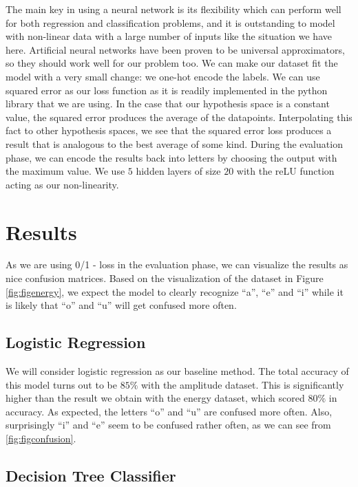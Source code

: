 \documentclass[letterpaper,12pt]{article}
\begin{document}
The main key in using a neural network is its flexibility which can perform well for both regression and classification problems, and it is outstanding to model with non-linear data with a large number of inputs like the situation we have here. Artificial neural networks have been proven to be universal approximators, so they should work well for our problem too. We can make our dataset fit the model with a very small change: we one-hot encode the labels. We can use squared error as our loss function as it is readily implemented in the python library that we are using. In the case that our hypothesis space is a constant value, the squared error produces the average of the datapoints. Interpolating this fact to other hypothesis spaces, we see that the squared error loss produces a result that is analogous to the best average of some kind. During the evaluation phase, we can encode the results back into letters by choosing the output with the maximum value. We use $5$ hidden layers of size $20$ with the reLU function acting as our non-linearity.


\section{Results}

As we are using 0/1 - loss in the evaluation phase, we can visualize the results as nice confusion matrices. Based on the visualization of the dataset in Figure \ref{fig:figenergy}, we expect the model to clearly recognize ``a'', ``e'' and ``i'' while it is likely that ``o'' and ``u'' will get confused more often.

\subsection{Logistic Regression}

We will consider logistic regression as our baseline method. The total accuracy of this model turns out to be $85\%$ with the amplitude dataset. This is significantly higher than the result we obtain with the energy dataset, which scored $80\%$ in accuracy. As expected, the letters ``o'' and ``u'' are confused more often. Also, surprisingly ``i'' and ``e'' seem to be confused rather often, as we can see from \ref{fig:figconfusion}.

\subsection{Decision Tree Classifier}
\end{document}
